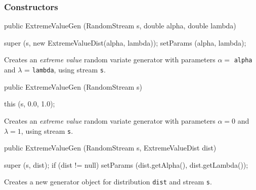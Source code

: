 \subsubsection* {Constructors}
\begin{code}

   public ExtremeValueGen (RandomStream s, double alpha, double lambda) \begin{hide} {
      super (s, new ExtremeValueDist(alpha, lambda));
      setParams (alpha, lambda);
   }\end{hide}
\end{code}
\begin{tabb} Creates an \emph{extreme value} random variate generator with
 parameters $\alpha =$ \texttt{alpha} and $\lambda $ = \texttt{lambda},
 using stream \texttt{s}.
\end{tabb}
\begin{code}

   public ExtremeValueGen (RandomStream s) \begin{hide} {
      this (s, 0.0, 1.0);
   }\end{hide}
\end{code}
\begin{tabb} Creates an \emph{extreme value} random variate generator with
 parameters $\alpha = 0$ and $\lambda =1$, using stream \texttt{s}.
\end{tabb}
\begin{code}

   public ExtremeValueGen (RandomStream s, ExtremeValueDist dist) \begin{hide} {
      super (s, dist);
      if (dist != null)
         setParams (dist.getAlpha(), dist.getLambda());
   }\end{hide}
\end{code}
\begin{tabb}
   Creates a new generator object for distribution \texttt{dist} and
   stream \texttt{s}.
\end{tabb}


